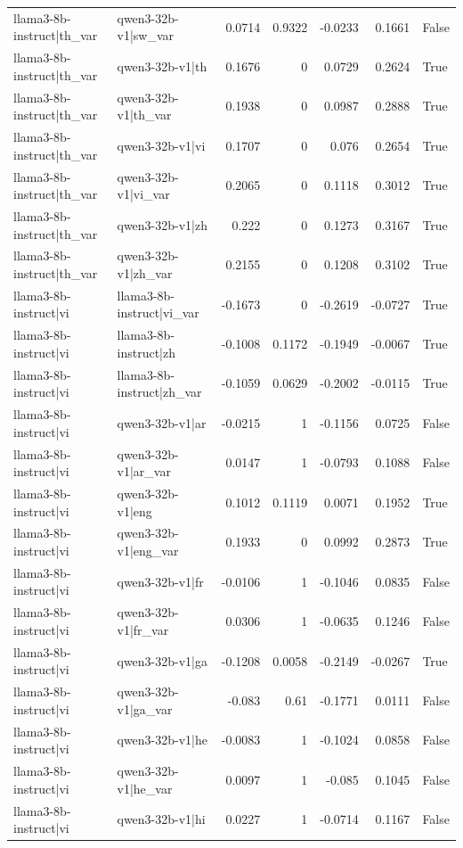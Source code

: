 \begin{table}
\begin{tabular}{l l r r r r l}
llama3-8b-instruct|th_var & qwen3-32b-v1|sw_var & 0.0714 & 0.9322 & -0.0233 & 0.1661 & False \\
llama3-8b-instruct|th_var & qwen3-32b-v1|th & 0.1676 & 0 & 0.0729 & 0.2624 & True \\
llama3-8b-instruct|th_var & qwen3-32b-v1|th_var & 0.1938 & 0 & 0.0987 & 0.2888 & True \\
llama3-8b-instruct|th_var & qwen3-32b-v1|vi & 0.1707 & 0 & 0.076 & 0.2654 & True \\
llama3-8b-instruct|th_var & qwen3-32b-v1|vi_var & 0.2065 & 0 & 0.1118 & 0.3012 & True \\
llama3-8b-instruct|th_var & qwen3-32b-v1|zh & 0.222 & 0 & 0.1273 & 0.3167 & True \\
llama3-8b-instruct|th_var & qwen3-32b-v1|zh_var & 0.2155 & 0 & 0.1208 & 0.3102 & True \\
llama3-8b-instruct|vi & llama3-8b-instruct|vi_var & -0.1673 & 0 & -0.2619 & -0.0727 & True \\
llama3-8b-instruct|vi & llama3-8b-instruct|zh & -0.1008 & 0.1172 & -0.1949 & -0.0067 & True \\
llama3-8b-instruct|vi & llama3-8b-instruct|zh_var & -0.1059 & 0.0629 & -0.2002 & -0.0115 & True \\
llama3-8b-instruct|vi & qwen3-32b-v1|ar & -0.0215 & 1 & -0.1156 & 0.0725 & False \\
llama3-8b-instruct|vi & qwen3-32b-v1|ar_var & 0.0147 & 1 & -0.0793 & 0.1088 & False \\
llama3-8b-instruct|vi & qwen3-32b-v1|eng & 0.1012 & 0.1119 & 0.0071 & 0.1952 & True \\
llama3-8b-instruct|vi & qwen3-32b-v1|eng_var & 0.1933 & 0 & 0.0992 & 0.2873 & True \\
llama3-8b-instruct|vi & qwen3-32b-v1|fr & -0.0106 & 1 & -0.1046 & 0.0835 & False \\
llama3-8b-instruct|vi & qwen3-32b-v1|fr_var & 0.0306 & 1 & -0.0635 & 0.1246 & False \\
llama3-8b-instruct|vi & qwen3-32b-v1|ga & -0.1208 & 0.0058 & -0.2149 & -0.0267 & True \\
llama3-8b-instruct|vi & qwen3-32b-v1|ga_var & -0.083 & 0.61 & -0.1771 & 0.0111 & False \\
llama3-8b-instruct|vi & qwen3-32b-v1|he & -0.0083 & 1 & -0.1024 & 0.0858 & False \\
llama3-8b-instruct|vi & qwen3-32b-v1|he_var & 0.0097 & 1 & -0.085 & 0.1045 & False \\
llama3-8b-instruct|vi & qwen3-32b-v1|hi & 0.0227 & 1 & -0.0714 & 0.1167 & False \\

\end{tabular}
\end{table}
